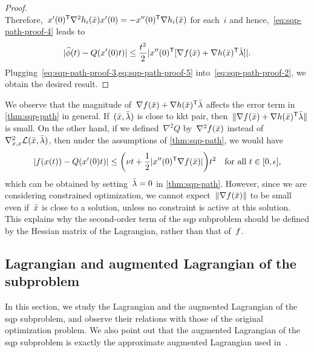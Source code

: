 \begin{proof}
\begin{equation*}
    \end{equation*}
    Therefore,~$\iter'(0)^{\T} \nabla^2 h_i(\bar{\iter}) \iter'(0) = -\iter''(0)^{\T} \nabla h_i(\bar{\iter})$ for each~$i$ and hence,~\cref{eq:sqp-path-proof-4} leads to
    \begin{equation}
        \label{eq:sqp-path-proof-5}
        \abs{\widehat{\phi}(t) - Q(x'(0) t)} \le \frac{t^2}{2} \abs{\iter''(0)^{\T} [\nabla \obj(\bar{\iter}) + \nabla h(\bar{\iter})^{\T} \bar{\lm}]}.
    \end{equation}
    Plugging~\cref{eq:sqp-path-proof-3,eq:sqp-path-proof-5} into~\cref{eq:sqp-path-proof-2}, we obtain the desired result.
\end{proof}
We observe that the magnitude of~$\nabla \obj(\bar{\iter}) + \nabla h(\bar{\iter})^{\T} \bar{\lm}$ affects the error term in \cref{thm:sqp-path} in general.
If~$(\bar{\iter}, \bar{\lm})$ is close to \gls{kkt} pair, then~$\norm{\nabla \obj(\bar{\iter}) + \nabla h(\bar{\iter})^{\T} \bar{\lm}}$ is small.
On the other hand, if we defined~$\nabla^2 Q$ by~$\nabla^2 f(\bar{x})$ instead of~$\nabla_{x, x}^2 \lag(\bar{\iter}, \bar{\lm})$, then under the assumptions of \cref{thm:sqp-path}, we would have
\begin{equation*}
    \abs{\obj(\iter(t)) - Q(x'(0) t)} \le \bigg( \nu t + \frac{1}{2}\abs{\iter''(0)^{\T} \nabla \obj(\bar{\iter})} \bigg) t^2 \quad \text{for all~$t \in [0, \epsilon]$,}
\end{equation*}
which can be obtained by setting~$\bar{\lm} = 0$ in \cref{thm:sqp-path}.
However, since we are considering constrained optimization, we cannot expect~$\norm{\nabla \obj(\bar{\iter})}$ to be small even if~$\bar{\iter}$ is close to a solution, unless no constraint is active at this solution.
This explains why the second-order term of the \gls{sqp} subproblem should be defined by the Hessian matrix of the Lagrangian, rather than that of~$f$.

\subsection{Lagrangian and augmented Lagrangian of the  subproblem}

In this section, we study the Lagrangian and the augmented Lagrangian of the \gls{sqp} subproblem, and observe their relations with those of the original optimization problem.
We also point out that the augmented Lagrangian of the \gls{sqp} subproblem is exactly the approximate augmented Lagrangian used in~\cite{Niu_Yuan_2010,Wang_Yuan_2014}.

